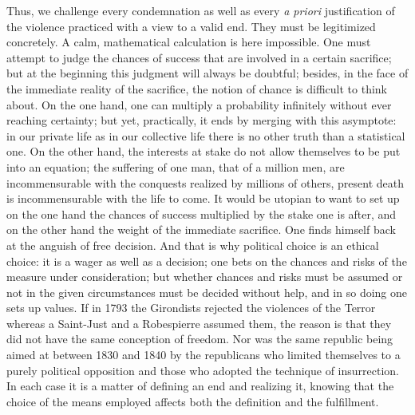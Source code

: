 \documentclass[11pt]{article}
\begin{document}
{{Thus, we challenge every condemnation as well as every \textit{a priori} justification of the violence practiced with a view to a valid end. They must be legitimized concretely. A calm, mathematical calculation is here impossible. One must attempt to judge the chances of success that are involved in a certain sacrifice; but at the beginning this judgment will always be doubtful; besides, in the face of the immediate reality of the sacrifice, the notion of chance is difficult to think about. On the one hand, one can multiply a probability infinitely without ever reaching certainty; but yet, practically, it ends by merging with this asymptote: in our private life as in our collective life there is no other truth than a statistical one. On the other hand, the interests at stake do not allow themselves to be put into an equation; the suffering of one man, that of a million men, are incommensurable with the conquests realized by millions of others, present death is incommensurable with the life to come. It would be utopian to want to set up on the one hand the chances of success multiplied by the stake one is after, and on the other hand the weight of the immediate sacrifice. One finds himself back at the anguish of free decision. And that is why political choice is an ethical choice: it is a wager as well as a decision; one bets on the chances and risks of the measure under consideration; but whether chances and risks must be assumed or not in the given circumstances must be decided without help, and in so doing one sets up values. If in 1793 the Girondists rejected the violences of the Terror whereas a Saint-Just and a Robespierre assumed them, the reason is that they did not have the same conception of freedom. Nor was the same republic being aimed at between 1830 and 1840 by the republicans who limited themselves to a purely political opposition and those who adopted the technique of insurrection. In each case it is a matter of defining an end and realizing it, knowing that the choice of the means employed affects both the definition and the fulfillment.

}}
\end{document}
